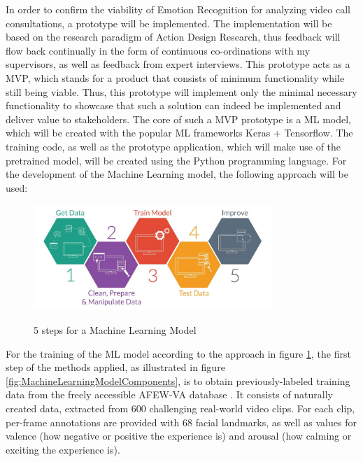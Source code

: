 \documentclass[11pt,a4paper]{scrbook}
\begin{document}
In order to confirm the viability of Emotion Recognition for analyzing video call consultations, a prototype will be implemented. The implementation will be based on the research paradigm of Action Design Research, thus feedback will flow back continually in the form of continuous co-ordinations with my supervisors, as well as feedback from expert interviews.\cite{Sein:2011:ActionDesignResearch}
\newline\newline
This prototype acts as a \gls{MVP}, which stands for a product that consists of minimum functionality while still being viable. Thus, this prototype will implement only the minimal necessary functionality to showcase that such a solution can indeed be implemented and deliver value to stakeholders.
\newline\newline
The core of such a \gls{MVP} prototype is a \gls{ML} model, which will be created with the popular \gls{ML} frameworks Keras + Tensorflow. The training code, as well as the prototype application, which will make use of the pretrained model, will be created using the Python programming language.
\newline\newline
For the development of the Machine Learning model, the following approach will be used:

\begin{figure}[H]
  \begin{center}
  \includegraphics[width=0.8\textwidth]{Figures/machine_learning.jpg}
  \caption{5 steps for a Machine Learning Model} \cite{Poddar:2016:MachineLearning}
  \label{fig:Poddar:2016:MachineLearning}
  \end{center}
\end{figure}

For the training of the \gls{ML} model according to the approach in figure \ref{fig:Poddar:2016:MachineLearning}, the first step of the methods applied, as illustrated in figure \ref{fig:MachineLearningModelComponents}, is to obtain previously-labeled training data from the freely accessible AFEW-VA database \cite{Kossaifi:2017:AFEW-VADatabase}. It consists of naturally created data, extracted from 600 challenging real-world video clips. For each clip, per-frame annotations are provided with 68 facial landmarks, as well as values for valence (how negative or positive the experience is) and arousal (how calming or exciting the experience is).
\newpage
\end{document}
